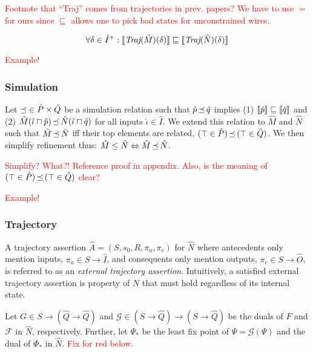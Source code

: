 \textcolor{red}{Footnote that ``Traj'' comes from trajectories in prev. papers? We have to use $=$ for ours since $\sqsubseteq$ allows one to pick bad states for unconstrained wires.}

\begin{equation*}
\forall \delta \in \hat I^{+} : \llbracket\textit{Traj}(\hat M)(\delta)\rrbracket \sqsubseteq \llbracket\textit{Traj}(\hat N)(\delta)\rrbracket
\end{equation*}

\textcolor{red}{Example!}

\subsubsection{Simulation} Let $\operatorname{\mathrel{\preceq}} \in \hat P \times \hat Q$ be a simulation relation such that $\hat p \operatorname{\mathrel{\preceq}} \hat q$ implies (1) $\llbracket\hat p\rrbracket \sqsubseteq \llbracket\hat q\rrbracket$ and (2) $\hat M(\hat \iota \sqcap \hat p) \operatorname{\mathrel{\preceq}} \hat N(\hat \iota \sqcap \hat q)$ for all inputs $\hat \iota \in \hat I$. We extend this relation to $\hat M$ and $\hat N$ such that $\hat M \operatorname{\mathrel{\preceq}} \hat N$ iff their top elements are related, $(\top \in \hat P) \operatorname{\mathrel{\preceq}} \, (\top \in \hat Q)$. We then simplify refinement thus: $\hat M \leq \hat N \Leftrightarrow \hat M \operatorname{\mathrel{\preceq}} \hat N$.

\textcolor{red}{Simplify? What?! Reference proof in appendix. Also, is the meaning of $(\top \in \hat P) \operatorname{\mathrel{\preceq}} \, (\top \in \hat Q)$ clear?}

\textcolor{red}{Example!}


\subsubsection{Trajectory} A trajectory assertion $\hat A = (S,s_{0},R,\pi_{a},\pi_{c})$ for $\hat N$ where antecedents only mention inputs, $\pi_{a} \in S \rightarrow \hat I$, and consequents only mention outputs, $\pi_{c} \in S \rightarrow \hat O$, is referred to as an \textit{external trajectory assertion}. Intuitively, a satisfied external trajectory assertion is property of $N$ that must hold regardless of its internal state.

Let $G \in S \rightarrow (\hat Q \rightarrow \hat Q)$ and $\mathcal{G} \in (S \rightarrow \hat Q) \rightarrow (S \rightarrow \hat Q)$ be the duals of $F$ and $\mathcal{F}$ in $\hat N$, respectively. Further, let $\Psi_{*}$ be the least fix point of $\Psi = \mathcal{G}(\Psi)$ and the dual of $\Phi_{*}$ in $\hat N$. \textcolor{red}{Fix for red below.}

